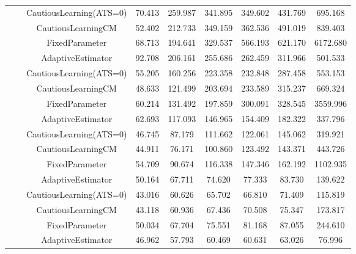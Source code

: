 \begin{table}[!h]
\begin{tabular}[t]{ccccccccc}
 &  & CautiousLearning(ATS=0) & 70.413 & 259.987 & 341.895 & 349.602 & 431.769 & 695.168\\

 &  & CautiousLearningCM & 52.402 & 212.733 & 349.159 & 362.536 & 491.019 & 839.403\\

 & \multirow[t]{-4}{*}{\centering\arraybackslash 0.25} & FixedParameter & 68.713 & 194.641 & 329.537 & 566.193 & 621.170 & 6172.680\\
\cmidrule{2-9}
 &  & AdaptiveEstimator & 92.708 & 206.161 & 255.686 & 262.459 & 311.966 & 501.533\\

 &  & CautiousLearning(ATS=0) & 55.205 & 160.256 & 223.358 & 232.848 & 287.458 & 553.153\\

 &  & CautiousLearningCM & 48.633 & 121.499 & 203.694 & 233.589 & 315.237 & 669.324\\

 & \multirow[t]{-4}{*}{\centering\arraybackslash 0.35} & FixedParameter & 60.214 & 131.492 & 197.859 & 300.091 & 328.545 & 3559.996\\
\cmidrule{2-9}
 &  & AdaptiveEstimator & 62.693 & 117.093 & 146.965 & 154.409 & 182.322 & 337.796\\

 &  & CautiousLearning(ATS=0) & 46.745 & 87.179 & 111.662 & 122.061 & 145.062 & 319.921\\

 &  & CautiousLearningCM & 44.911 & 76.171 & 100.860 & 123.492 & 143.371 & 443.726\\

 & \multirow[t]{-4}{*}{\centering\arraybackslash 0.50} & FixedParameter & 54.709 & 90.674 & 116.338 & 147.346 & 162.192 & 1102.935\\
\cmidrule{2-9}
 &  & AdaptiveEstimator & 50.164 & 67.711 & 74.620 & 77.333 & 83.730 & 139.622\\

 &  & CautiousLearning(ATS=0) & 43.016 & 60.626 & 65.702 & 66.810 & 71.409 & 115.819\\

 &  & CautiousLearningCM & 43.118 & 60.936 & 67.436 & 70.508 & 75.347 & 173.817\\

 & \multirow[t]{-4}{*}{\centering\arraybackslash 0.75} & FixedParameter & 50.034 & 67.704 & 75.551 & 81.168 & 87.055 & 244.610\\
\cmidrule{2-9}
 &  & AdaptiveEstimator & 46.962 & 57.793 & 60.469 & 60.631 & 63.026 & 76.996\\


\end{tabular}
\end{table}
